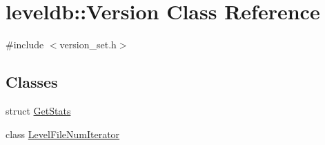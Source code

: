 \hypertarget{classleveldb_1_1_version}{}\section{leveldb\+:\+:Version Class Reference}
\label{classleveldb_1_1_version}


{\ttfamily \#include $<$version\+\_\+set.\+h$>$}

\subsection*{Classes}
\begin{DoxyCompactItemize}
\item 
struct \hyperlink{structleveldb_1_1_version_1_1_get_stats}{Get\+Stats}
\item 
class \hyperlink{classleveldb_1_1_version_1_1_level_file_num_iterator}{Level\+File\+Num\+Iterator}
\end{DoxyCompactItemize}
